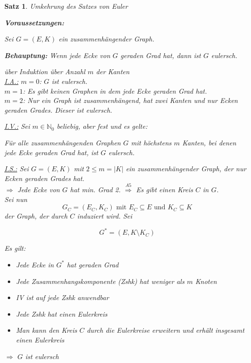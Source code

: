 \documentclass[a4paper,9pt]{scrartcl}
\newlength\Thmindent
\newenvironment{precondition}
  {\par\medskip\adjustwidth{\Thmindent}{}\normalfont\textbf{Voraussetzungen:}\par\nobreak}
  {\endadjustwidth}
\newenvironment{claim}
  {\par\medskip\adjustwidth{\Thmindent}{}\normalfont\textbf{Behauptung:}}
  {\endadjustwidth}
\theoremstyle{plain}
\newtheorem{theorem}{Satz}
\newcommand{\cmark}{\ding{51}}%
\begin{document}
\begin{theorem}{Umkehrung des Satzes von Euler}
    ~~~
    \begin{precondition}
        Sei $G = (E, K)$ ein zusammenhängender Graph.
    \end{precondition}
    \begin{claim}
        Wenn jede Ecke von $G$ geraden Grad hat, dann ist $G$ eulersch.
    \end{claim}
    \begin{Proof} über Induktion über Anzahl $m$ der Kanten\\
        \underline{I.A.:} $m=0$: $G$ ist eulersch. \cmark\\
        $m=1$: Es gibt keinen Graphen in dem jede Ecke geraden Grad hat. \cmark\\
        $m=2$: Nur ein Graph ist zusammenhängend, hat zwei Kanten und nur Ecken geraden Grades. Dieser ist eulersch. \cmark

        \underline{I.V.:} Sei $m \in \mathbb{N}_0$ beliebig, aber fest und 
        es gelte: 

        Für alle zusammenhängenden Graphen $G$ mit höchstens $m$ Kanten, bei denen jede Ecke geraden Grad hat, ist $G$ eulersch.

        \underline{I.S.:} Sei $G=(E,K)$ mit $2 \leq m  = |K|$ ein zusammenhängender Graph, der nur Ecken geraden Grades hat.\\
        $\Rightarrow$ Jede Ecke von $G$ hat min. Grad 2.
        $\stackrel{A5}{\Rightarrow}$ Es gibt einen Kreis $C$ in $G$.\\

        Sei nun 
            \[G_C = (E_C, K_C) \text{ mit } E_C \subseteq E \text{ und } K_C \subseteq K \]
        der Graph, der durch $C$ induziert wird.
        Sei 

            \[ G^* = (E, K \setminus K_C) \]

        Es gilt: 
        \begin{itemize}
            \item Jede Ecke in $G^*$ hat geraden Grad
            \item Jede Zusammenhangskomponente (Zshk) hat weniger als $m$ Knoten
            \item[$\Rightarrow$] IV ist auf jede Zshk anwendbar
            \item[$\Rightarrow$] Jede Zshk hat einen Eulerkreis
            \item[$\Rightarrow$] Man kann den Kreis $C$ durch die Eulerkreise erweitern und erhält insgesamt einen Eulerkreis
        \end{itemize}
        $\Rightarrow$ $G$ ist eulersch 
    \end{Proof}
\end{theorem}
\end{document}
